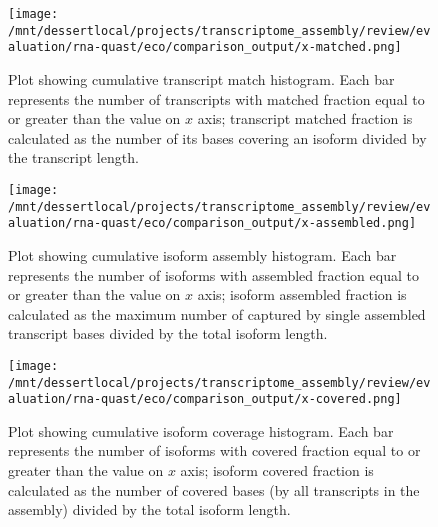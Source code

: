 \documentclass[12pt,a4paper]{article}
\begin{document}
\begin{figure}[t]
\centering
\texttt{[image: /mnt/dessertlocal/projects/transcriptome\_assembly/review/evaluation/rna-quast/eco/comparison\_output/x-matched.png]}
\caption{Plot showing cumulative transcript match histogram. Each bar represents the number of transcripts with matched fraction equal to or greater than the value on $x$ axis; transcript matched fraction is calculated as the number of its bases covering an isoform divided by the transcript length.}
\end{figure}
\FloatBarrier
\clearpage


\begin{figure}[t]
\centering
\texttt{[image: /mnt/dessertlocal/projects/transcriptome\_assembly/review/evaluation/rna-quast/eco/comparison\_output/x-assembled.png]}
\caption{Plot showing cumulative isoform assembly histogram. Each bar represents the number of isoforms with assembled fraction equal to or greater than the value on $x$ axis; isoform assembled fraction is calculated as the maximum number of captured by single assembled transcript bases divided by the total isoform length.}
\end{figure}
\FloatBarrier
\clearpage


\begin{figure}[t]
\centering
\texttt{[image: /mnt/dessertlocal/projects/transcriptome\_assembly/review/evaluation/rna-quast/eco/comparison\_output/x-covered.png]}
\caption{Plot showing cumulative isoform coverage histogram. Each bar represents the number of isoforms with covered fraction equal to or greater than the value on $x$ axis; isoform covered fraction is calculated as the number of covered bases (by all transcripts in the assembly) divided by the total isoform length.}
\end{figure}
\FloatBarrier
\clearpage
\end{document}

